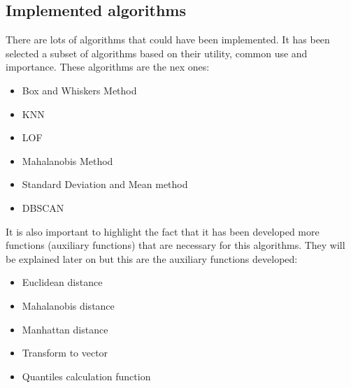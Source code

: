 \documentclass{article}
\begin{document}
\subsection{Implemented algorithms}
There are lots of algorithms that could have been implemented. It has been selected a subset of algorithms based on their utility, common use and importance. These algorithms are the nex ones:
\begin{itemize}
    \item Box and Whiskers Method
    \item KNN
    \item LOF
    \item Mahalanobis Method
    \item Standard Deviation and Mean method
    \item DBSCAN
\end{itemize}
It is also important to highlight the fact that it has been developed more functions (auxiliary functions) that are necessary for this algorithms. They will be explained later on but this are the auxiliary functions developed:
\begin{itemize}
    \item Euclidean distance
    \item Mahalanobis distance
    \item Manhattan distance
    \item Transform to vector
    \item Quantiles calculation function
\end{itemize}
\end{document}

